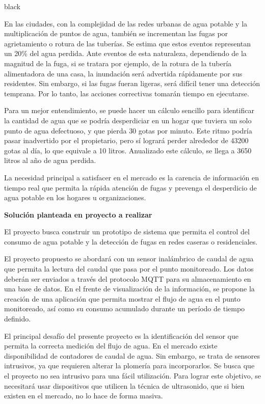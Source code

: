 \documentclass[
11pt, %
codirector, %
]{charter}
\begin{document}
\begin{consigna}{black}
\pagebreak 

En las ciudades, con la complejidad de las redes urbanas de agua potable y la multiplicación de puntos de agua, también se incrementan las fugas por agrietamiento o rotura de las tuberías. Se estima que estos eventos representan un 20\% del agua perdida. Ante eventos de esta naturaleza, dependiendo de la magnitud de la fuga, si se tratara por ejemplo, de la rotura de la tubería alimentadora de una casa, la inundación será advertida rápidamente por sus residentes. Sin embargo, si las fugas fueran ligeras, será difícil tener una detección temprana. Por lo tanto, las acciones correctivas tomarán tiempo en ejecutarse.

Para un mejor entendimiento, se puede hacer un cálculo sencillo para identificar la cantidad de agua que se podría desperdiciar en un hogar que tuviera un solo punto de agua defectuoso, y que pierda 30 gotas por minuto. Este ritmo podría pasar inadvertido por el propietario, pero sí logrará perder alrededor de 43200 gotas al día, lo que equivale a 10 litros. Anualizado este cálculo, se llega a 3650 litros al año de agua perdida.

La necesidad principal a satisfacer en el mercado es la carencia de información en tiempo real que permita la rápida atención de fugas y prevenga el desperdicio de agua potable en los hogares u organizaciones.


\textbf{Solución planteada en proyecto a realizar} 

El proyecto busca construir un prototipo de sistema que permita el control del consumo de agua potable y la detección de fugas en redes caseras o residenciales. 

El proyecto propuesto se abordará con un sensor inalámbrico de caudal de agua que permita la lectura del caudal que pasa por el punto monitoreado. Los datos deberán ser enviados a través del protocolo MQTT para su almacenamiento en una base de datos. En el frente de visualización de la información, se propone la creación de una aplicación que permita mostrar el flujo de agua en el punto monitoreado, así como su consumo acumulado durante un período de tiempo definido. 

El principal desafío del presente proyecto es la identificación del sensor que permita la correcta medición del flujo de agua. En el mercado existe disponibilidad de contadores de caudal de agua. Sin embargo, se trata de sensores intrusivos, ya que requieren alterar la plomería para incorporarlos. Se busca que el proyecto no sea intrusivo para una fácil utilización. Para lograr este objetivo, se necesitará usar dispositivos que utilicen la técnica de ultrasonido, que si bien existen en el mercado, no lo hace de forma masiva.


\end{consigna}
\end{document}

